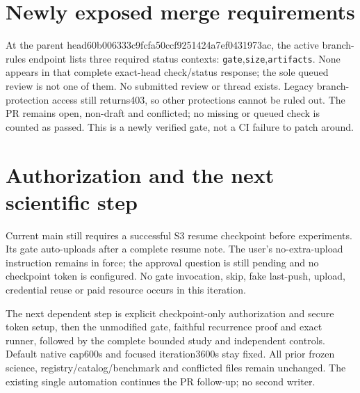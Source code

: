 \documentclass[10pt]{article}
\begin{document}
\section*{Newly exposed merge requirements}
At the parent head60b006333c9fcfa50ccf9251424a7ef0431973ac,
the active branch-rules endpoint lists three required status contexts:
\texttt{gate},\texttt{size},\texttt{artifacts}. None appears in that complete
exact-head check/status response; the sole queued review is not one of them.
No submitted review or thread exists. Legacy branch-protection access still
returns403, so other protections cannot be ruled out. The PR remains open,
non-draft and conflicted; no missing or queued check is counted as passed.
This is a newly verified gate, not a CI failure to patch around.

\section*{Authorization and the next scientific step}
Current main still requires a successful S3 resume checkpoint before experiments.
Its gate auto-uploads after a complete resume note. The user's no-extra-upload
instruction remains in force; the approval question is still pending and no
checkpoint token is configured. No gate invocation, skip, fake last-push,
upload, credential reuse or paid resource occurs in this iteration.

The next dependent step is explicit checkpoint-only authorization and secure
token setup, then the unmodified gate, faithful recurrence proof and exact
runner, followed by the complete bounded study and independent controls.
Default native cap600s and focused iteration3600s stay fixed. All prior frozen
science, registry/catalog/benchmark and conflicted files remain unchanged.
The existing single automation continues the PR follow-up; no second writer.
\end{document}
